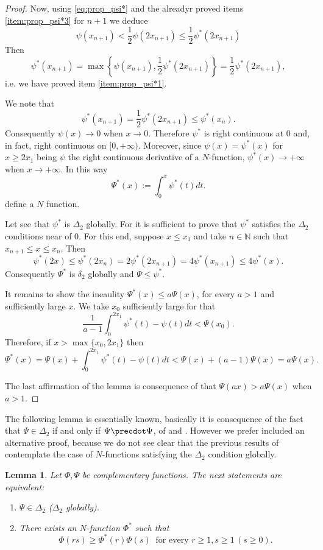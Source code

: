 \documentclass[twoside]{article}
\newtheorem{lem}[thm]{Lemma}
\theoremstyle{remark}
\renewcommand{\leq}{\leqslant}
\renewcommand{\geq}{\geqslant}
\begin{document}
\begin{proof}
Now, using \eqref{eq:prop_psi*} and the alreadyr proved items \ref{item:prop_psi*3} for $n+1$ we deduce
\[\psi(x_{n+1})<\frac12\psi(2x_{n+1})\leq \frac12\psi^*(2x_{n+1}) \]
Then
\[\psi^*(x_{n+1})=\max\left\{\psi(x_{n+1}),\frac12\psi^*(2x_{n+1}) \right\}=\frac12\psi^*(2x_{n+1}),\]
i.e. we have proved item \ref{item:prop_psi*1}.

We note that
\[\psi^*(x_{n+1})=\frac12\psi^*(2x_{n+1})\leq\psi^*(x_{n}).\]
Consequently $\psi(x)\to 0$ when $x\to 0$. Therefore $\psi^*$ is right continuous at $0$ and, in fact, right continuous on $[0,+\infty)$. Moreover, since $\psi(x)=\psi^*(x)$ for $x\geq 2x_1$ being $\psi$ the right continuous derivative of a $N$-function, $\psi^*(x)\to +\infty$ when $x\to +\infty$. In this way
\[\Psi^*(x):=\int_0^x\psi^*(t)dt.\]
define a $N$ function.

Let  see that $\psi^*$ is $\Delta_2$ globally.
For it is sufficient to prove that $\psi^*$ satisfies the $ \Delta_2$ conditions near of $0$. For this end, suppose $x\leq x_1$ and take $n\in\mathbb{N}$ such that $x_{n+1}\leq x\leq x_n$. Then
\[\psi^*(2x)\leq \psi^*(2x_n)=2\psi^*(2x_{n+1})=4\psi^*(x_{n+1})\leq 4\psi^*(x).\]
Consequently $\Psi^*$ is $\delta_2$ globally and $\Psi\leq \psi^*$.

It remains to show the ineaulity $\Psi^*(x)\leq a\Psi(x)$, for every $a>1$ and sufficiently large $x$. We take $x_0$ sufficiently large for that
\[\frac{1}{a-1}\int_0^{2x_1}\psi^*(t)-\psi(t)dt<\Psi(x_0).\]
Therefore, if  $x>\max\{x_0,2x_1\}$ then
\[\Psi^*(x)=\Psi(x)+\int_0^{2x_1}\psi^*(t)-\psi(t)dt<\Psi(x)+(a-1)\Psi(x)= a\Psi(x).\]

The last affirmation of the lemma is consequence of that  $\Psi(ax)>a\Psi(x)$ when $a>1$. 

\end{proof}

The following lemma is essentially known, basically it is consequence of the fact that $\Psi\in\Delta_2$ if and only if $\Psi\precdot\Psi$, of  \cite[Prop. 4, p. 20]{rao1991theory} and \cite[Cor. 10, p. 30]{rao1991theory}. However we prefer included an alternative proof, because we do not see clear that the previous results of \cite{rao1991theory} contemplate the case of $N$-functions satisfying the $\Delta_2$ condition globally.



\begin{lem}\label{lem:submultipliativa}
Let $\Phi,\Psi$ be complementary functions.
The next statements are equivalent:
\begin{enumerate}
\item\label{item1} $\Psi \in \Delta_2$ ($\Delta_2$ globally).
\item\label{item2} There exists an $N$-function $\Phi^*$ such that
\begin{equation}\label{eq:caract_delta2}
\Phi(rs)\geq \Phi^*(r)\Phi(s)\;\;\mbox{for every }r\geq1,s\geq 1\, (s\geq 0).
\end{equation}
\end{enumerate}
\end{lem}
\end{document}
